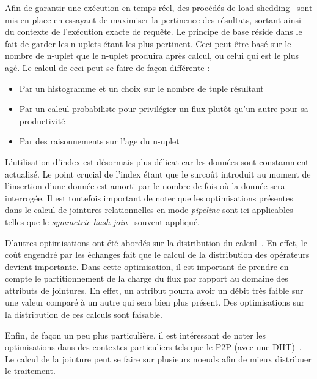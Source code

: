 Afin de garantir une exécution en temps réel, des procédés de load-shedding~\cite{Tatbul:load-shedding} sont mis en place en essayant de maximiser la pertinence des résultats, sortant ainsi du contexte de l'exécution exacte de requête. Le principe de base réside dans le fait de garder les n-uplets étant les plus pertinent. Ceci peut être basé sur le nombre de n-uplet que le n-uplet produira après calcul, ou celui qui est le plus agé. Le calcul de ceci peut se faire de façon différente :
\begin{itemize}
 \item Par un histogramme et un choix sur le nombre de tuple résultant~\cite{Han:join}
 \item Par un calcul probabiliste pour privilégier un flux plutôt qu'un autre pour sa productivité~\cite{Han:join}
 \item Par des raisonnements sur l'age du n-uplet~\cite{Srivastava:join}
\end{itemize}

L'utilisation d'index est désormais plus délicat car les données sont constamment actualisé. Le point crucial de l'index étant que le surcoût introduit au moment de l'insertion d'une donnée est amorti par le nombre de fois où la donnée sera interrogée. Il est toutefois important de noter que les optimisations présentes dans le calcul de jointures relationnelles en mode \textit{pipeline} sont ici applicables telles que le \textit{symmetric hash join}~\cite{Wilschut:symetricjoin} souvent appliqué.

D'autres optimisations ont été abordés sur la distribution du calcul~\cite{Zhou:pmjoin}. En effet, le coût engendré par les échanges fait que le calcul de la distribution des opérateurs devient importante. Dans cette optimisation, il est important de prendre en compte le partitionnement de la charge du flux par rapport au domaine des attributs de jointures. En effet, un attribut pourra avoir un débit très faible sur une valeur comparé à un autre qui sera bien plus présent. Des optimisations sur la distribution de ces calculs sont faisable.

Enfin, de façon un peu plus particulière, il est intéressant de noter les optimisations dans des contextes particuliers tels que le P2P (avec une DHT)~\cite{Palma:p2p}. Le calcul de la jointure peut se faire sur plusieurs noeuds afin de mieux distribuer le traitement.

